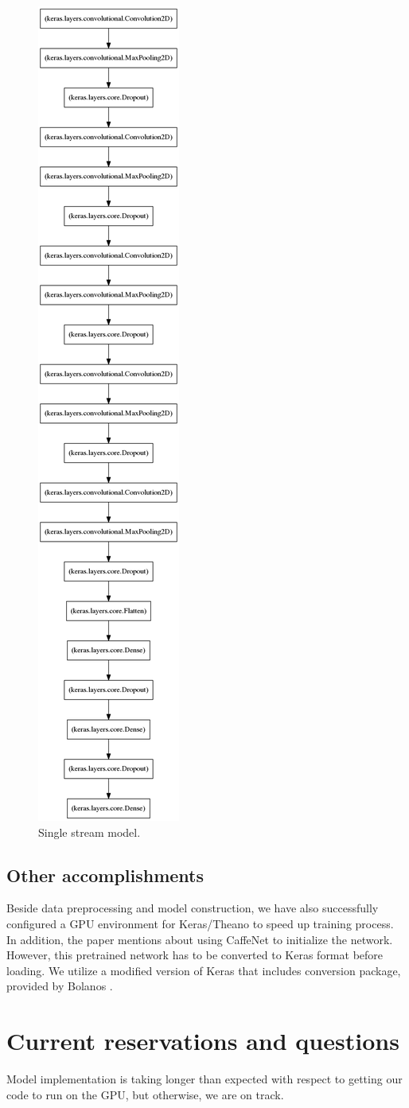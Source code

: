 \documentclass[paper=letter, fontsize=12pt]{article}
\begin{document}
\begin{figure}[htbp]
	\centering
	\includegraphics[width=.24\textwidth]{stream_model}
	\caption{Single stream model.}
	\label{fig:stream_model}
\end{figure}

\subsection{Other accomplishments}
Beside data preprocessing and model construction, we have also successfully configured a GPU environment for Keras/Theano to speed up training process. In addition, the paper mentions about using CaffeNet to initialize the network. However, this pretrained network has to be converted to Keras format before loading. We utilize a modified version of Keras that includes conversion package, provided by Bolanos \cite{Bolanos2016}.

\section{Current reservations and questions}

Model implementation is taking longer than expected with respect to getting our code to run on the GPU, but otherwise, we are on track.

\newpage




\end{document}
